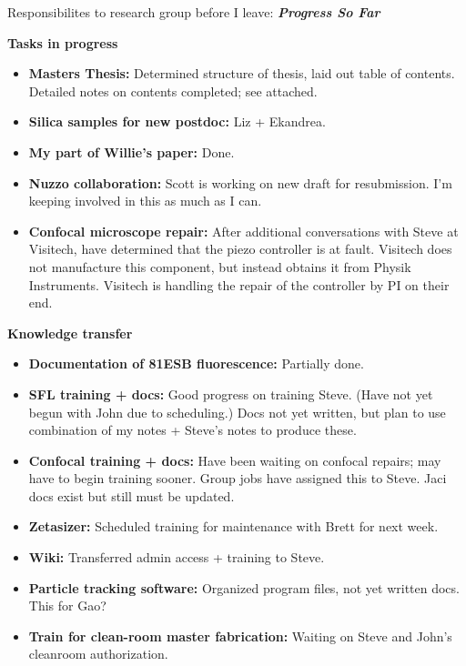 \documentclass[11pt]{article}
\newcommand{\bigsection}[1]{	
	\vspace{4pt}
	{\fontfamily{phv}\selectfont\Large#1}

}
\begin{document}
\selectfont

\bigsection{Responsibilites to research group before I leave: \textbf{\textit{Progress So Far}}}

\textbf{Tasks in progress}
\begin{itemize}

\item \textbf{Masters Thesis:} Determined structure of thesis, laid out table of contents. Detailed notes on contents completed; 
see attached.

\item \textbf{Silica samples for new postdoc:} Liz + Ekandrea.

\item \textbf{My part of Willie's paper:} Done.

\item \textbf{Nuzzo collaboration:} Scott is working on new draft for resubmission. I'm keeping involved in this as much as I can.

\item \textbf{Confocal microscope repair:} After additional conversations with Steve at Visitech, have determined that the piezo 
controller is at fault.  Visitech does not manufacture this component, but instead obtains it from Physik Instruments. Visitech is
handling the repair of the controller by PI on their end.

\end{itemize}

\textbf{Knowledge transfer}
\begin{itemize}

\item \textbf{Documentation of 81ESB fluorescence:} Partially done.

\item \textbf{SFL training + docs:} Good progress on training Steve. (Have not yet begun with John due to scheduling.) Docs not yet
written, but plan to use combination of my notes + Steve's notes to produce these.

\item \textbf{Confocal training + docs:} Have been waiting on confocal repairs; may have to begin training sooner. Group jobs have
assigned this to Steve. Jaci docs exist but still must be updated.

\item \textbf{Zetasizer:} Scheduled training for maintenance with Brett for next week.

\item \textbf{Wiki:} Transferred admin access + training to Steve.

\item \textbf{Particle tracking software:} Organized program files, not yet written docs. This for Gao?

\item \textbf{Train for clean-room master fabrication:} Waiting on Steve and John's cleanroom authorization.

\end{itemize}
\end{document}
